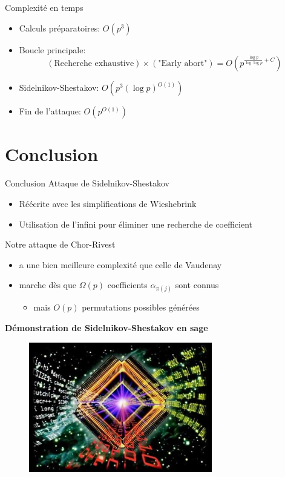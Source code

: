\documentclass[]{beamer}
\begin{document}
\begin{frame}{Complexité en temps}
\begin{itemize}
\item Calculs préparatoires: $O\left(p^3\right)$
\item Boucle principale:
$$ (\text{Recherche exhaustive}) \times (\text{"Early abort"}) = O\left( p^{\frac{\log p}{\log \log p} + C} \right) $$
\item Sidelnikov-Shestakov: $O\left(p^3 (\log p)^{O(1)} \right)$
\item Fin de l'attaque: $O\left(p^{O(1)}\right)$
\end{itemize}

\end{frame}


\section{Conclusion}

\begin{frame}{Conclusion}
Attaque de Sidelnikov-Shestakov
\begin{itemize}
\item Réécrite avec les simplifications de Wieshebrink
\item Utilisation de l'infini pour éliminer une recherche de coefficient
\end{itemize}

Notre attaque de Chor-Rivest
\begin{itemize}
\item a une bien meilleure complexité que celle de Vaudenay
\item marche dès que $\Omega(p)$ coefficients $\alpha_{\pi(j)}$ sont connus
\begin{itemize}
\item mais $O(p)$ permutations possibles générées
\end{itemize}
\end{itemize}
\end{frame}

\begin{frame}
\begin{center}
\huge{\textbf{Démonstration de Sidelnikov-Shestakov en sage}}
\end{center}
\begin{figure}
   \centering
   \includegraphics[width=8cm]{pictures/simul.jpg}
\end{figure}
\end{frame}
\end{document}
